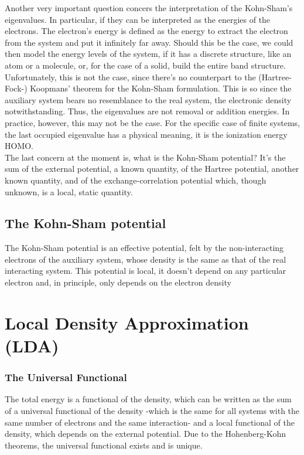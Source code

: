 \documentclass{homework}
\begin{document}
Another very important question concers the interpretation of the Kohn-Sham's eigenvalues. In particular, if they can be interpreted as the energies of the electrons. The electron's energy is defined as the energy to extract the electron from the system and put it infinitely far away. Should this be the case, we could then model the energy levels of the system, if it has a discrete structure, like an atom or a molecule, or, for the case of a solid, build the entire band structure. Unfortunately, this is not the case, since there's no counterpart to the (Hartree-Fock-) Koopmans' theorem for the Kohn-Sham formulation. This is so since the auxiliary system bears no resemblance to the real system, the electronic density notwithstanding. Thus, the eigenvalues are not removal or addition energies. In practice, however, this may not be the case. For the specific case of finite systems, the last occupied eigenvalue has a physical meaning, it is the ionization energy HOMO. \\

The last concern at the moment is, what is the Kohn-Sham potential? It's the sum of the external potential, a known quantity, of the Hartree potential, another known quantity, and of the exchange-correlation potential which, though unknown, is a local, static quantity. 

\subsection{The Kohn-Sham potential}

The Kohn-Sham potential is an effective potential, felt by the non-interacting electrons of the auxiliary system, whose density is the same as that of the real interacting system. This potential is local, it doesn't depend on any particular electron and, in principle, only depends on the electron density 

\section{Local Density Approximation (LDA)}

\subsubsection{The Universal Functional}

The total energy is a functional of the density, which can be written as the sum of a universal functional of the density -which is the same for all systems with the same number of electrons and the same interaction- and a local functional of the density, which depends on the external potential. Due to the Hohenberg-Kohn theorems, the universal functional exists and is unique. \\
\end{document}
